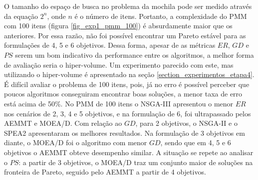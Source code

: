 O tamanho do espaço de busca no problema da mochila pode ser medido através da equação $2^n$, onde $n$ é o número de itens. Portanto, a complexidade do PMM com 100 itens (figura \ref{fig_exp1_pmm_100}) é absurdamente maior que os anteriores. Por essa razão, não foi possível encontrar um Pareto estável para as formulações de 4, 5 e 6 objetivos. Dessa forma, apesar de as métricas $ER$, $GD$ e $PS$ serem um bom indicativo da performance entre os algoritmos, a melhor forma de avaliação seria o hiper-volume. Um experimento parecido com este, mas utilizando o hiper-volume é apresentado na seção \ref{section_experimentos_etapa4}. É difícil avaliar o problema de 100 itens, pois, já no erro é possível perceber que poucos algoritmos conseguiram encontrar boas soluções, a menor taxa de erro está acima de 50\%. No PMM de 100 itens o NSGA-III apresentou o menor $ER$ nos cenários de 2, 3, 4 e 5 objetivos, e na formulação de 6, foi ultrapassado pelos AEMMT e MOEA/D. Com relação ao $GD$, para 2 objetivos, o NSGA-II e o SPEA2 apresentaram os melhores resultados. Na formulação de 3 objetivos em diante, o MOEA/D foi o algoritmo com menor $GD$, sendo que em 4, 5 e 6 objetivos o AEMMT obteve desempenho similar. A situação se repete ao analisar o $PS$: a partir de 3 objetivos, o MOEA/D traz um conjunto maior de soluções na fronteira de Pareto, seguido pelo AEMMT a partir de 4 objetivos.

